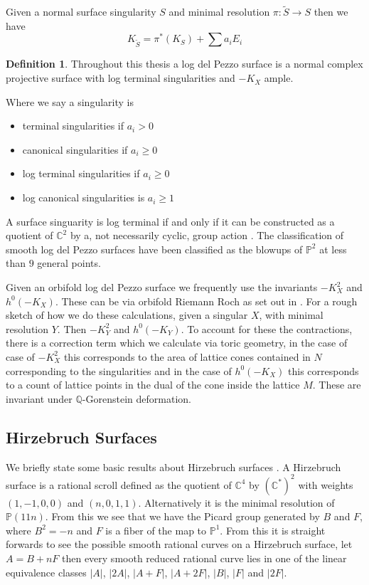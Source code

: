 \documentclass[12pt,a4paper]{book}      %
\theoremstyle{definition}
\newtheorem{dfn}[thm]{Definition}
\newcommand{\mb}[1]{\mathbb{#1}}
\newcommand{\ra}{\rightarrow}
\newcommand{\wt}[1]{\widetilde #1}
\begin{document}
Given a normal surface singularity $S$ and minimal resolution $\pi \colon \wt{S} \ra S$ then we have 
\[
K_{\wt{S}} = \pi^*(K_S) + \sum a_i E_i
\] 
\begin{dfn}\label{Log Terminal}
Throughout this thesis a log del Pezzo surface is a normal complex projective surface with log terminal singularities and ${-}K_X$ ample.
\end{dfn}
Where we say a singularity is 
\begin{itemize}
\item terminal singularities if $a_i > 0$
\item canonical singularities if $a_i \geq 0$
\item log terminal singularities if $a_i \geq 0$
\item log canonical singularities is $a_i \geq 1$
\end{itemize}
A surface singuarity is log terminal if and only if it can be constructed as a quotient of $\mb{C}^2$  by a, not necessarily cyclic, group action \cite{Kawamata}. The classification of smooth log del Pezzo surfaces have been classified as the blowups of $\mb{P}^2$ at less than $9$ general points.

Given an orbifold log del Pezzo surface we frequently use the invariants 
${-}K_X^2$ and $h^0({-}K_X)$. These can be via orbifold Riemann Roch as set out in \cite{Young}. For a rough sketch of how we do these calculations, given a singular $X$, with minimal resolution $Y$. Then ${-}K_Y^2$ and $h^0({-}K_Y)$. To account for these the contractions, there is a correction term which we calculate via toric geometry, in the case of case of ${-}K_X^2$ this corresponds to the area of lattice cones contained in $N$ corresponding to the singularities and in the case of $h^0({-}K_X)$ this corresponds to a count of lattice points in the dual of the cone inside the lattice $M$.  These are invariant under $\mb{Q}$-Gorenstein deformation. 
 
\subsection{Hirzebruch Surfaces} %
We briefly state some basic results about Hirzebruch surfaces \cite{Park}. A Hirzebruch surface is a rational scroll defined as the quotient of $\mb{C}^4$ by $(\mb{C}^*)^2$ with weights $(1,-1,0,0)$ and $(n, 0, 1,1)$. Alternatively it is the minimal resolution of $\mb{P}(11n)$. From this we see that we have the Picard group generated by $B$ and $F$, where $B^2 = -n$ and $F$ is a fiber of the map to $\mb{P}^1$. From this it is straight forwards to see the possible smooth rational curves on a Hirzebruch surface, let $A = B+ nF$ then every smooth reduced rational curve lies in one of the linear equivalence classes $|A|$, $|2A|$, $|A+F|$, $|A+2F|$, $|B|$, $|F|$ and $|2F|$. 
\end{document}
